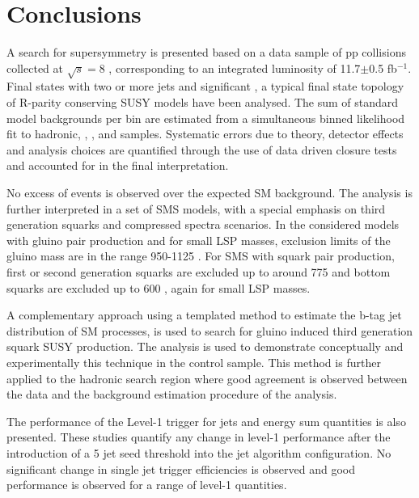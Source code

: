 \chapter{Conclusions}
\label{chap:conclusions}

A search for supersymmetry is presented based on a data sample of pp collisions collected at $\sqrt{s} = 8$ \TeV, corresponding to an integrated luminosity of 11.7$\pm$0.5 fb$^{-1}$. Final states with two or more jets and significant \met, a typical final state topology of R-parity conserving \ac{SUSY} models have been analysed. The sum of standard model backgrounds per bin are estimated from a simultaneous binned likelihood fit to hadronic, \mupjets, \dimupjets, and \gpjets samples. Systematic errors due to theory, detector effects and analysis choices are quantified through the use of data driven closure tests and accounted for in the final interpretation. 

No excess of events is observed over the expected \ac{SM} background. The analysis is further interpreted in a set of \ac{SMS} models, with a special emphasis on third generation squarks and compressed spectra scenarios. In the considered models with gluino pair production and for small \ac{LSP} masses, exclusion limits of the gluino mass are in the range 950-1125 \GeV. For \ac{SMS} with squark pair production, first or second generation squarks are excluded up to around 775 \GeV and bottom squarks are excluded up to 600 \GeV, again for small \ac{LSP} masses.

A complementary approach using a templated method to estimate the b-tag jet distribution of \ac{SM} processes, is used to search for gluino induced third generation squark \ac{SUSY} production. The \alphat analysis is used to demonstrate conceptually and experimentally this technique in the \mupjets control sample. This method is further applied to the \alphat hadronic search region where good agreement is observed between the data and the background estimation procedure of the \alphat analysis.

The performance of the Level-1 trigger for jets and energy sum quantities is also presented. These studies quantify any change in level-1 performance after the introduction of a 5 \GeV jet seed threshold into the jet algorithm configuration. No significant change in single jet trigger efficiencies is observed and good performance is observed for a range of level-1 quantities.

